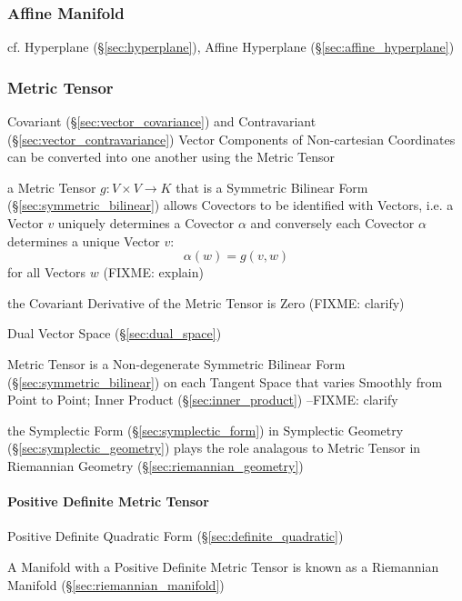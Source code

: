\subsubsection{Affine Manifold}\label{sec:affine_manifold}

cf. Hyperplane (\S\ref{sec:hyperplane}), Affine Hyperplane
(\S\ref{sec:affine_hyperplane})



\subsubsection{Metric Tensor}\label{sec:metric_tensor}

Covariant (\S\ref{sec:vector_covariance}) and Contravariant
(\S\ref{sec:vector_contravariance}) Vector Components of Non-cartesian
Coordinates can be converted into one another using the Metric Tensor

a Metric Tensor $g : V \times V \rightarrow K$ that is a Symmetric Bilinear Form
(\S\ref{sec:symmetric_bilinear}) allows Covectors to be identified with Vectors,
i.e. a Vector $v$ uniquely determines a Covector $\alpha$ and conversely each
Covector $\alpha$ determines a unique Vector $v$:
\[
  \alpha (w) = g (v,w)
\]
for all Vectors $w$
(FIXME: explain)

the Covariant Derivative of the Metric Tensor is Zero (FIXME: clarify)

Dual Vector Space (\S\ref{sec:dual_space})

Metric Tensor is a Non-degenerate Symmetric Bilinear Form
(\S\ref{sec:symmetric_bilinear}) on each Tangent Space that varies Smoothly from
Point to Point; Inner Product (\S\ref{sec:inner_product}) --FIXME: clarify

the Symplectic Form (\S\ref{sec:symplectic_form}) in Symplectic Geometry
(\S\ref{sec:symplectic_geometry}) plays the role analagous to Metric Tensor in
Riemannian Geometry (\S\ref{sec:riemannian_geometry})



\paragraph{Positive Definite Metric Tensor}
\label{sec:positive_definite_metric_tensor}\hfill

Positive Definite Quadratic Form (\S\ref{sec:definite_quadratic})

A Manifold with a Positive Definite Metric Tensor is known as a
Riemannian Manifold (\S\ref{sec:riemannian_manifold})




